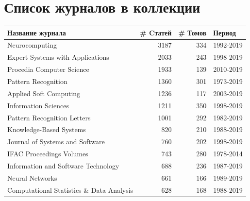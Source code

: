 \documentclass[12pt]{article}
\let\oldsection\section
\renewcommand{\section}{\clearpage\oldsection}
\begin{document}
\section{Список журналов в коллекции}
\label{appendix:journals}
\begin{center}
	\def\arraystretch{0.8}
	{\small
		\begin{longtable}{lrrl}
			\toprule
			Название журнала                                                                     & \# Cтатей & \# Томов & Период    \\
			\midrule			 
			\endhead
			Neurocomputing                                                                       &      3187 &      334 & 1992-2019 \\
			Expert Systems with Applications                                                     &      2033 &      243 & 1998-2019 \\
			Procedia Computer Science                                                            &      1933 &      139 & 2010-2019 \\
			Pattern Recognition                                                                  &      1360 &      301 & 1973-2019 \\
			Applied Soft Computing                                                               &      1236 &      117 & 2003-2019 \\
			Information Sciences                                                                 &      1211 &      350 & 1998-2019 \\
			Pattern Recognition Letters                                                          &      1001 &      292 & 1982-2019 \\
			Knowledge-Based Systems                                                              &       820 &      210 & 1988-2019 \\
			Journal of Systems and Software                                                      &       760 &      202 & 1998-2019 \\
			IFAC Proceedings Volumes                                                             &       743 &      280 & 1978-2014 \\
			Information and Software Technology                                                  &       688 &      236 & 1987-2019 \\
			Neural Networks                                                                      &       661 &      166 & 1989-2019 \\
			Computational Statistics \& Data Analysis                                            &       628 &      168 & 1988-2019 \\

\end{longtable}}
\end{center}
\end{document}
